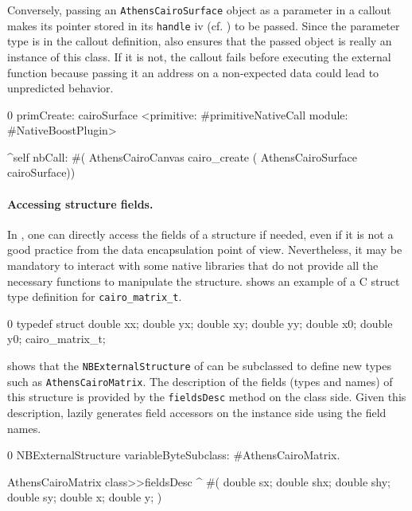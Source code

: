 Conversely, passing an \texttt{AthensCairoSurface} object as a parameter in a callout makes its pointer stored in its \texttt{handle} iv (cf. ) to be passed.
Since the parameter type is  in the callout definition, \NB also ensures that the passed object is really an instance of this class.
If it is not, the callout fails before executing the external function because passing it an address on a non-expected data could lead to unpredicted behavior.

\begin{stcode}[
	label={lst:calloutOpaqueStructParameter},
	caption={Example of passing a structure by reference}]{0}
primCreate: cairoSurface
	<primitive: #primitiveNativeCall
	 module: #NativeBoostPlugin>

	^self nbCall: #(
        AthensCairoCanvas cairo_create (
                  AthensCairoSurface cairoSurface))
\end{stcode}


\paragraph{Accessing structure fields.}
In \NB, one can directly access the fields of a structure if needed, even if it is not a good practice from the data encapsulation point of view.
Nevertheless, it may be mandatory to interact with some native libraries that do not provide all the necessary functions to manipulate the structure.
 shows an example of a C struct type definition for \texttt{cairo\_matrix\_t}.

\begin{ccode}[
	label={lst:cairo_c_definition},
	caption={Example external type to convert back and forth with the Cairo library}]{0}
typedef struct {
    double xx; double yx;
    double xy; double yy;
    double x0; double y0;
} cairo_matrix_t;
\end{ccode}

 shows that the \texttt{NBExternalStructure} of \NBFFI can be subclassed to define new types such as \texttt{AthensCairoMatrix}.
The description of the fields (types and names) of this structure is provided by the \texttt{fieldsDesc} method on the class side.
Given this description, \NB lazily generates field accessors on the instance side using the field names.

\begin{stcode}[
	label={lst:AthensCairoMatrix},
	caption={Example of \NBFFI definition of an \texttt{ExternalStructure}}]{0}
NBExternalStructure
    variableByteSubclass: #AthensCairoMatrix.

AthensCairoMatrix class>>fieldsDesc
	^ #(  double sx; double shx;
		  double shy; double sy;
		  double x; double y;  )
\end{stcode}

